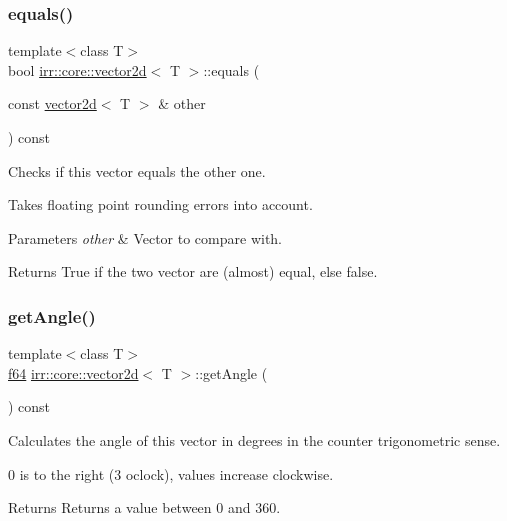 \subsubsection{\texorpdfstring{equals()}{equals()}}
{\footnotesize\ttfamily template$<$class T$>$ \\
bool \hyperlink{classirr_1_1core_1_1vector2d}{irr\+::core\+::vector2d}$<$ T $>$\+::equals (\begin{DoxyParamCaption}\item[{const \hyperlink{classirr_1_1core_1_1vector2d}{vector2d}$<$ T $>$ \&}]{other }\end{DoxyParamCaption}) const\hspace{0.3cm}{\ttfamily [inline]}}



Checks if this vector equals the other one. 

Takes floating point rounding errors into account. 
\begin{DoxyParams}{Parameters}
{\em other} & Vector to compare with. \\
\hline
\end{DoxyParams}
\begin{DoxyReturn}{Returns}
True if the two vector are (almost) equal, else false. 
\end{DoxyReturn}
\mbox{\label{classirr_1_1core_1_1vector2d_ad41700e8cbebb9899430c576140ee6fd}} 
\subsubsection{\texorpdfstring{get\+Angle()}{getAngle()}}
{\footnotesize\ttfamily template$<$class T$>$ \\
\hyperlink{namespaceirr_a1325b02603ad449f92c68fc640af9b28}{f64} \hyperlink{classirr_1_1core_1_1vector2d}{irr\+::core\+::vector2d}$<$ T $>$\+::get\+Angle (\begin{DoxyParamCaption}{ }\end{DoxyParamCaption}) const\hspace{0.3cm}{\ttfamily [inline]}}



Calculates the angle of this vector in degrees in the counter trigonometric sense. 

0 is to the right (3 o\textquotesingle{}clock), values increase clockwise. \begin{DoxyReturn}{Returns}
Returns a value between 0 and 360. 
\end{DoxyReturn}
\mbox{\label{classirr_1_1core_1_1vector2d_a5aa73f5d0487d651af7dd3ea4a51ea67}} 
